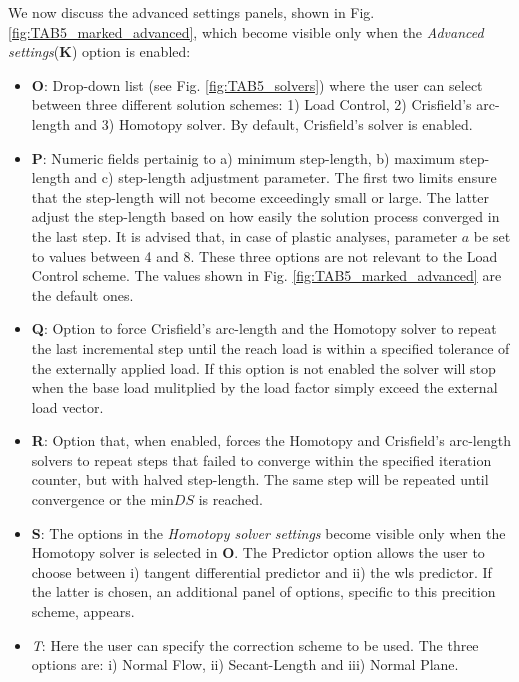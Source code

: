 We now discuss the advanced settings panels, shown in Fig. 
\ref{fig:TAB5_marked_advanced}, which become visible only when the 
\textit{Advanced settings}(\textbf{K}) option is enabled:

\begin{itemize}
	\item \textbf{O}: Drop-down list (see Fig. \ref{fig:TAB5_solvers}) where 
	the user can select between three different solution schemes: 1) Load 
	Control, 2) Crisfield's arc-length and 3) Homotopy solver. By default, 
	Crisfield's solver is enabled. 
	\item \textbf{P}: Numeric fields pertainig to a) minimum step-length, b) 
	maximum step-length and c) step-length adjustment parameter. The first two 
	limits ensure that the step-length will not become exceedingly small or 
	large. The latter adjust the step-length based on how easily the solution 
	process converged in the last step. It is advised that, in case of plastic 
	analyses, parameter $a$ be set to values between 4 and 8. These three 
	options are not relevant to the Load Control scheme. The values shown in 
	Fig. \ref{fig:TAB5_marked_advanced} are the default ones.
	\item \textbf{Q}: Option to force Crisfield's arc-length and the Homotopy 
	solver to repeat the last incremental step until the reach load is within a 
	specified tolerance of the externally applied load. If this option is not 
	enabled the solver will stop when the base load mulitplied by the load 
	factor simply exceed the external load vector.
	\item \textbf{R}: Option that, when enabled, forces the Homotopy and 
	Crisfield's arc-length solvers to repeat steps that failed to converge 
	within the specified iteration counter, but with halved step-length. The 
	same step will be repeated until convergence or the min$DS$ is reached.
	\item \textbf{S}: The options in the \textit{Homotopy solver settings} 
	become visible only when the Homotopy solver is selected in \textbf{O}. The 
	Predictor option allows the user to choose between i) tangent differential 
	predictor and ii) the \acrshort{wls} predictor. If the latter is chosen, an 
	additional panel of options, specific to this precition scheme, appears.
	\item \textit{T}: Here the user can specify the correction scheme to be 
	used. The three options are: i) Normal Flow\cite{Watson:1989}, ii) 
	Secant-Length\cite{Schwetlick87} and iii) Normal Plane\cite{Riks:1979}.
	

\end{itemize}
